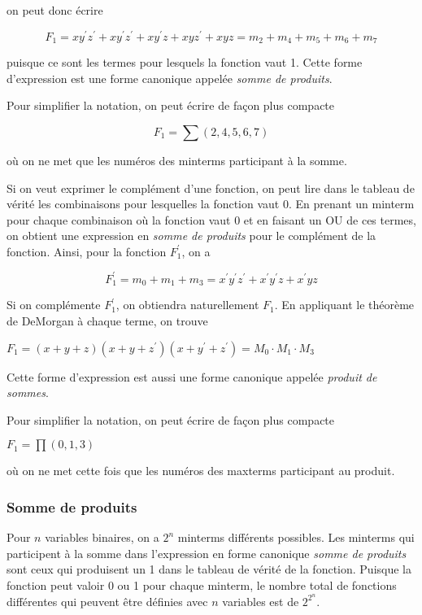 \documentclass[11pt]{article}
\begin{document}
on peut donc écrire

$$ F_1 = x y^\prime
z^\prime + x y^\prime z^\prime + x y^\prime z + x y z^\prime + x y z =
m_2 + m_4 + m_5 + m_6 + m_7 $$

puisque ce sont les termes pour lesquels la fonction vaut 1. Cette
forme d'expression est une forme canonique appelée \emph{somme de
produits}.

Pour simplifier la notation, on peut écrire de façon plus compacte  

$$F_1 = \sum (2, 4, 5, 6, 7)$$

où on ne met que les numéros des minterms participant à la somme.

Si on veut exprimer le complément d'une fonction, on peut lire dans le
tableau de vérité les combinaisons pour lesquelles la fonction
vaut 0. En prenant un minterm pour chaque combinaison où la fonction
vaut 0 et en faisant un OU de ces termes, on obtient une expression en
\emph{somme de produits} pour le complément de la fonction. Ainsi, pour la
fonction \(F_1^\prime\), on a

$$ F_1^\prime = m_0 + m_1 + m_3 = x^\prime y^\prime z^\prime +
x^\prime y^\prime z + x^\prime y z $$

Si on complémente \(F_1^\prime\), on obtiendra naturellement
\(F_1\). En appliquant le théorème de DeMorgan à chaque terme, on
trouve

\(F_1 = (x+ y+ z)(x + y + z^\prime)(x + y^\prime + z^\prime) = M_0
\cdot M_1 \cdot M_3\)

Cette forme d'expression est aussi une forme canonique appelée
\emph{produit de sommes}.

Pour simplifier la notation, on peut écrire de façon plus compacte  

\(F_1 = \prod (0,1,3)\)

où on ne met cette fois que les numéros des maxterms participant au
produit.

\subsubsection{Somme de produits}
\label{sec:org2fdad0b}

Pour \(n\) variables binaires, on a \(2^n\) minterms différents
possibles. Les minterms qui participent à la somme dans l'expression
en forme canonique \emph{somme de produits} sont ceux qui produisent un 1
dans le tableau de vérité de la fonction. Puisque la fonction peut
valoir 0 ou 1 pour chaque minterm, le nombre total de fonctions
différentes qui peuvent être définies avec \(n\) variables est de
\(2^{2^n}\).
\end{document}
